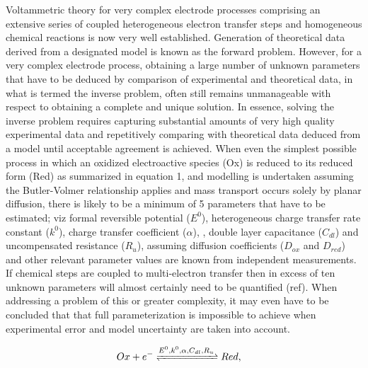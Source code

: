 \documentclass[a4paper, 12pt]{article}
\begin{document}
Voltammetric theory for very complex electrode processes comprising an extensive 
series of coupled heterogeneous electron transfer steps and homogeneous chemical 
reactions is now very well established. Generation of theoretical data derived 
from a designated model is known as the forward problem. However, for a very 
complex electrode process, obtaining a large  number of unknown parameters that 
have to be deduced by comparison of experimental and theoretical data, in what 
is termed the inverse problem, often still remains unmanageable with respect to 
obtaining a complete and unique solution. In essence, solving the inverse 
problem requires capturing substantial amounts of very high quality experimental 
data and repetitively comparing with theoretical data deduced from a model until 
acceptable agreement is achieved. When  even the simplest possible  process in 
which  an oxidized electroactive species (Ox) is reduced to its reduced form 
(Red) as  summarized in equation 1,   and modelling is undertaken assuming  the 
Butler-Volmer relationship applies and mass transport occurs solely by planar 
diffusion, there is likely to be a minimum of 5 parameters that have to be 
estimated; viz formal reversible potential ($E^0$), heterogeneous charge 
transfer rate constant ($k^0$), charge transfer coefficient ($\alpha$), , double 
layer capacitance ($C_{dl}$) and uncompensated resistance ($R_u$), assuming 
diffusion coefficients ($D_{ox}$ and $D_{red}$) and other relevant parameter 
values are known from independent measurements. If chemical steps are coupled to 
multi-electron transfer then in excess of ten unknown parameters will almost 
certainly need to be quantified (ref).  When addressing a problem of this or 
greater complexity, it may even have to be concluded that   that full 
parameterization is impossible to achieve when experimental error and model 
uncertainty are taken into account.

\begin{align} \label{eq:reaction}
Ox + e^- \cee{&<=>[E^0,k^0,\alpha, C_{dl}, R_u]} Red,
\end{align}
\end{document}
